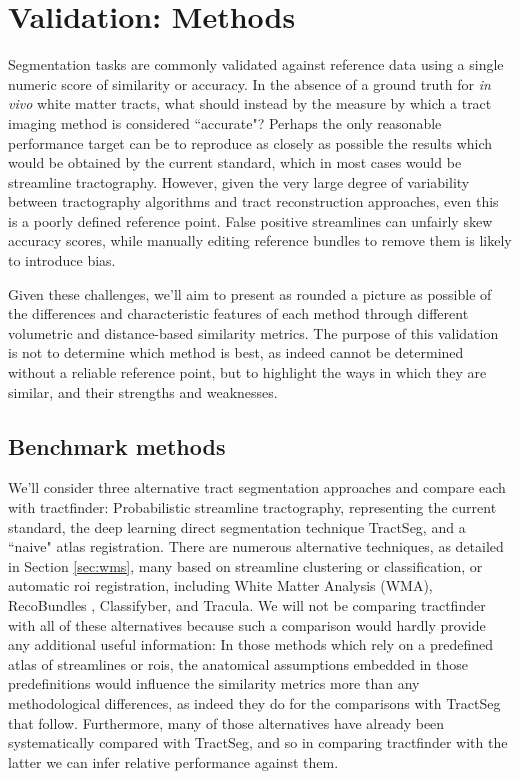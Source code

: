 
\section{Validation: Methods}

Segmentation tasks are commonly validated against reference data using a single numeric score of similarity or accuracy.
In the absence of a ground truth for \textit{in vivo} white matter tracts, what should instead by the measure by which a tract imaging method is considered ``accurate"?
Perhaps the only reasonable performance target can be to reproduce as closely as possible the results which would be obtained by the current standard, which in most cases would be streamline tractography.
However, given the very large degree of variability between tractography algorithms and tract reconstruction approaches, even this is a poorly defined reference point.
False positive streamlines can unfairly skew accuracy scores, while manually editing reference bundles to remove them is likely to introduce bias.

Given these challenges, we'll aim to present as rounded a picture as possible of the differences and characteristic features of each method through different volumetric and distance-based similarity metrics.
The purpose of this validation is not to determine which method is best, as indeed cannot be determined without a reliable reference point, but to highlight the ways in which they are similar, and their strengths and weaknesses.

\subsection{Benchmark methods}
\label{sec:methods}

We'll consider three alternative tract segmentation approaches and compare each with tractfinder: Probabilistic streamline tractography, representing the current standard, the deep learning direct segmentation technique TractSeg, and a ``naive" atlas registration.
There are numerous alternative techniques, as detailed in Section \ref{sec:wms}, many based on streamline clustering or classification, or automatic \gls{roi} registration, including White Matter Analysis (WMA)\autocite{ODonnell2017}, RecoBundles \autocite{Garyfallidis2018}, Classifyber\autocite{Berto2021}, and Tracula\autocite{Yendiki2011}.
We will not be comparing tractfinder with all of these alternatives because such a comparison would hardly provide any additional useful information:
In those methods which rely on a predefined atlas of streamlines or \glspl{roi}, the anatomical assumptions embedded in those predefinitions would influence the similarity metrics more than any methodological differences, as indeed they do for the comparisons with TractSeg that follow.
Furthermore, many of those alternatives have already been systematically compared with TractSeg\autocite{Wasserthal2018,Berto2021}, and so in comparing tractfinder with the latter we can infer relative performance against them.

